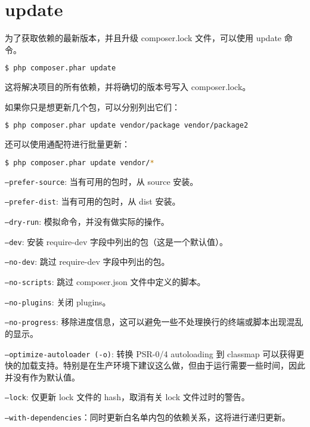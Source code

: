 \section{update}

为了获取依赖的最新版本，并且升级 composer.lock 文件，可以使用 update 命令。

\begin{lstlisting}[language=bash]
$ php composer.phar update
\end{lstlisting}

这将解决项目的所有依赖，并将确切的版本号写入 composer.lock。

如果你只是想更新几个包，可以分别列出它们：

\begin{lstlisting}[language=bash]
$ php composer.phar update vendor/package vendor/package2
\end{lstlisting}

还可以使用通配符进行批量更新：

\begin{lstlisting}[language=bash]
$ php composer.phar update vendor/*
\end{lstlisting}

\begin{compactitem}
\item \texttt{--prefer-source}: 当有可用的包时，从 source 安装。
\item \texttt{--prefer-dist}: 当有可用的包时，从 dist 安装。
\item \texttt{--dry-run}: 模拟命令，并没有做实际的操作。
\item \texttt{--dev}: 安装 require-dev 字段中列出的包（这是一个默认值）。
\item \texttt{--no-dev}: 跳过 require-dev 字段中列出的包。
\item \texttt{--no-scripts}: 跳过 composer.json 文件中定义的脚本。
\item \texttt{--no-plugins}: 关闭 plugins。
\item \texttt{--no-progress}: 移除进度信息，这可以避免一些不处理换行的终端或脚本出现混乱的显示。
\item \texttt{--optimize-autoloader (-o)}: 转换 PSR-0/4 autoloading 到 classmap 可以获得更快的加载支持。特别是在生产环境下建议这么做，但由于运行需要一些时间，因此并没有作为默认值。
\item \texttt{--lock}: 仅更新 lock 文件的 hash，取消有关 lock 文件过时的警告。
\item \texttt{--with-dependencies}：同时更新白名单内包的依赖关系，这将进行递归更新。
\end{compactitem}


